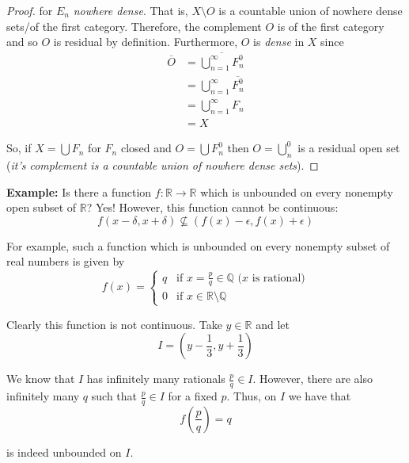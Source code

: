 \documentclass[12pt]{article}
\newlength\tindent
\renewcommand{\indent}{\hspace*{\tindent}}
\newcommand{\R}{\mathbb R}
\newcommand{\Q}{\mathbb Q}
\begin{document}
\begin{proof}
for $E_n$ {\em nowhere dense}. That is, $X\setminus O$ is a countable union of nowhere dense sets/of the first category. Therefore, the complement $O$ is of the first category and so $O$ is residual by definition. Furthermore, $O$ is {\em dense} in $X$ since
\begin{align*}
	\overline{O} &= \overline{\bigcup^\infty_{n = 1} F^0_n} \\
	&= \bigcup^\infty_{n = 1} \overline{F^0_n} \\
	&= \bigcup^\infty_{n = 1} F_n \\
	&= X
\end{align*}

So, if $X = \bigcup F_n$ for $F_n$ closed and $O = \bigcup F^0_n$ then $O = \bigcup^0_n$ is a residual open set ({\em it's complement is a countable union of nowhere dense sets}). 
\end{proof}

%
%
{\bf Example:} Is there a function $f:\R\to\R$ which is unbounded on every nonempty open subset of $\R$? Yes! However, this function cannot be continuous:
\begin{equation*}
	f(x - \delta, x + \delta) \nsubseteq \left( f(x) - \epsilon, f(x) + \epsilon \right) 
\end{equation*}

\indent For example, such a function which is unbounded on every nonempty subset of real numbers is given by
\begin{equation*}
	f(x) = 
	\begin{cases}
		q & \text{if } x = \frac{p}{q} \in \Q \text{ ($x$ is rational)} \\
		0 & \text{if $x \in \R\setminus\Q$}
	\end{cases}
\end{equation*}

Clearly this function is not continuous. Take $y \in \R$ and let
\begin{equation*}
	I = \left(y - \frac{1}{3}, y + \frac{1}{3} \right)
\end{equation*}

\indent We know that $I$ has infinitely many rationals $\frac{p}{q} \in I$. However, there are also infinitely many $q$ such that $\frac{p}{q} \in I$ for a fixed $p$. Thus, on $I$ we have that
\begin{equation*}
	f\left(\frac{p}{q}\right) = q
\end{equation*}

is indeed unbounded on $I$.
\end{document}
